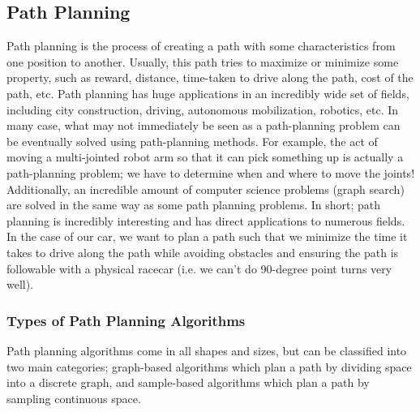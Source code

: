 \documentclass{article}
\begin{document}
\subsection{Path Planning}
Path planning is the process of creating a path with some characteristics from one position to another. Usually, this path tries to maximize or minimize some property, such as reward, distance, time-taken to drive along the path, cost of the path, etc. Path planning has huge applications in an incredibly wide set of fields, including city construction, driving, autonomous mobilization, robotics, etc. In many case, what may not immediately be seen as a path-planning problem can be eventually solved using path-planning methods. For example, the act of moving a multi-jointed robot arm so that it can pick something up is actually a path-planning problem; we have to determine when and where to move the joints! Additionally, an incredible amount of computer science problems (graph search) are solved in the same way as some path planning problems. In short; path planning is incredibly interesting and has direct applications to numerous fields. \\

In the case of our car, we want to plan a path such that we minimize the time it takes to drive along the path while avoiding obstacles and ensuring the path is followable with a physical racecar (i.e. we can't do 90-degree point turns very well).  

\subsubsection{Types of Path Planning Algorithms}
Path planning algorithms come in all shapes and sizes, but can be classified into two main categories; graph-based algorithms which plan a path by dividing space into a discrete graph, and sample-based algorithms which plan a path by sampling continuous space. \\
\end{document}
